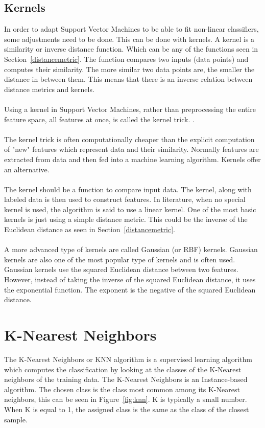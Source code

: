 \subsection{Kernels}
\label{kernels}
 In order to adapt Support Vector Machines to be able to fit non-linear classifiers, some adjustments need to be done. This can be done with kernels. A kernel is a similarity or inverse distance function. Which can be any of the functions seen in Section~\ref{distancemetric}. The function compares two inputs (data points) and computes their similarity. The more similar two data points are, the smaller the distance in between them. This means that there is an inverse relation between distance metrics and kernels. \\
\\
Using a kernel in Support Vector Machines, rather than preprocessing the entire feature space, all features at once, is called the kernel trick. \cite{kernelTrick}. \\
\\
The kernel trick is often computationally cheaper than the explicit computation of "new" features which represent data and their similarity. Normally features are extracted from data and then fed into a machine learning algorithm. Kernels offer an alternative. \\
\\
The kernel should be a function to compare input data. The kernel, along with labeled data is then used to construct features. In literature, when no special kernel is used, the algorithm is said to use a linear kernel. One of the most basic kernels is just using a simple distance metric. This could be the inverse of the Euclidean distance as seen in Section~\ref{distancemetric}.\\
\\
A more advanced type of kernels are called Gaussian (or RBF) kernels. Gaussian kernels are also one of the most popular type of kernels and is often used. Gaussian kernels use the squared Euclidean distance between two features. However, instead of taking the inverse of the squared Euclidean distance, it uses the exponential function. The exponent is the negative of the squared Euclidean distance. 

\section{K-Nearest Neighbors}
\label{algorithm:knn}
The K-Nearest Neighbors or KNN algorithm is a supervised learning algorithm which computes the classification by looking at the classes of the K-Nearest neighbors of the training data. The K-Nearest Neighbors is an Instance-based algorithm. \cite{mlcat} The chosen class is the class most common among its K-Nearest neighbors, this can be seen in Figure~\ref{fig:knn}. K is typically a small number. When K is equal to 1, the assigned class is the same as the class of the closest sample. 

